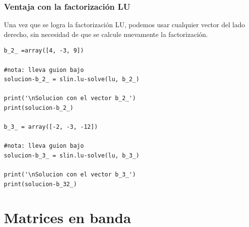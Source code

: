 \begin{frame}
\frametitle{Ventaja con la factorización LU}
Una vez que se logra la factorización LU, podemos usar cualquier vector del lado derecho, sin necesidad de que se calcule nuevamente la factorización.
\end{frame}
\begin{frame}
\begin{lstlisting}[caption=La misma factorización cambiando el vector b, style=FormattedNumber, basicstyle=\linespread{1.1}\ttfamily=\small, columns=fullflexible]
b_2_ =array([4, -3, 9])

#nota: lleva guion bajo
solucion-b_2_ = slin.lu-solve(lu, b_2_)

print('\nSolucion con el vector b_2_')
print(solucion-b_2_)

b_3_ = array([-2, -3, -12])

#nota: lleva guion bajo
solucion-b_3_ = slin.lu-solve(lu, b_3_)

print('\nSolucion con el vector b_3_')
print(solucion-b_32_)
\end{lstlisting}
\end{frame}
\section{Matrices en banda}
